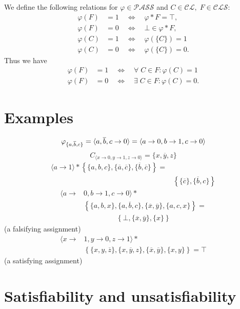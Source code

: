 \documentclass{article}
\def\mpass{{\mathcal{PASS}}}
\def\mcl{{\mathcal{CL}}}
\def\mcls{{\mathcal{CLS}}}
\def\q{{\quad}}
\begin{document}
We define the following relations for $\varphi \in \mpass$ and $C \in \mcl, \; F\in \mcls$:
\begin{align*}
\varphi(F) & = 1 \q \Leftrightarrow \q \varphi * F = \top, \\
\varphi(F) & = 0 \q \Leftrightarrow \q \bot \in \varphi * F, \\
\varphi(C) & = 1 \q \Leftrightarrow \q \varphi(\{C\}) = 1 \\
\varphi(C) & = 0 \q \Leftrightarrow \q \varphi(\{C\}) = 0.
\end{align*}
Thus we have
\begin{align*}
\varphi(F) & = 1 \q \Longleftrightarrow \q \forall \; C\in F : \varphi(C) = 1 \\
\varphi(F) & = 0 \q \Longleftrightarrow \q \exists \; C\in F : \varphi(C) = 0.
\end{align*}


\section{Examples}

\[
\varphi_{\{a,\overline{b},c\}} = \langle a, \overline{b}, c\to 0\rangle = \langle a\to 0, b\to 1, c\to 0 \rangle \\
\]
\[
C_{\langle x\to 0, y\to 1, z\to 0 \rangle} = \{x, \overline{y}, z\}
\]
\begin{align*}
\langle a\to 1 \rangle * \left\{\{a,b,c\}, \{\overline{a}, \overline{c}\}, \{\overline{b}, \overline{c}\} \right\} = & \\
& \left\{\{\overline{c}\}, \{\overline{b}, c\} \right\}
\end{align*}
\begin{align*}
\langle a\to & 0, b\to 1, c\to 0 \rangle * \\
& \left\{\{a,b,x\}, \{a,\overline{b},c\}, \{\overline{x}, \overline{y}\}, \{a,c,x\} \right\} = \\
& \qquad \qquad \;\; \left\{\bot, \{\overline{x}, \overline{y}\}, \{x\}\right\}
\end{align*}
(a falsifying assignment)
\begin{align*}
\langle x\to & 1, y\to 0, z\to 1 \rangle * \\
& \left\{\{x,y,\overline{z}\}, \{x,\overline{y},z\}, \{\overline{x}, \overline{y}\}, \{x,y\} \right\} = \top
\end{align*}
(a satisfying assignment)

\section{Satisfiability and unsatisfiability}
\end{document}
